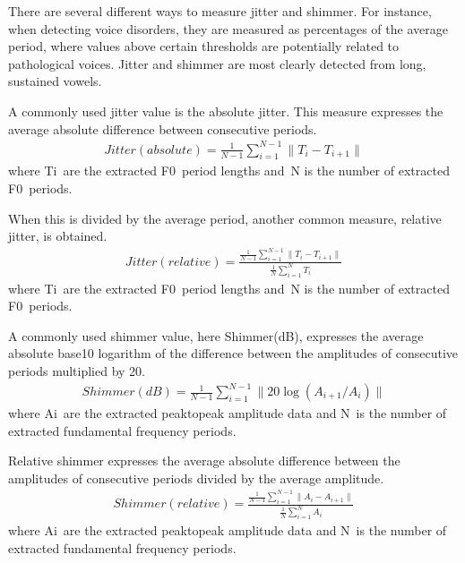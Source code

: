 \documentclass[letterpaper,10pt,english]{jupyterBook}
\begin{document}
\sphinxAtStartPar
There are several different ways to measure jitter and shimmer. For
instance, when detecting voice disorders, they are measured as
percentages of the average period, where values above certain thresholds
are potentially related to pathological voices. Jitter and shimmer are
most clearly detected from long, sustained vowels.

\sphinxAtStartPar
A commonly used jitter value is the absolute jitter. This measure
expresses the average absolute difference between consecutive periods.
\begin{equation*}
\begin{split} Jitter(absolute) = \frac{1}{N-1}\sum_{i=1}^{N-1}\|T_i-T_{i+1}\|
\end{split}
\end{equation*}
\sphinxAtStartPar
where Ti are the extracted F0 period lengths and N is the number of
extracted F0 periods.

\sphinxAtStartPar
When this is divided by the average period, another common measure,
relative jitter, is obtained.
\begin{equation*}
\begin{split} Jitter(relative) =
\frac{\frac{1}{N-1}\sum_{i=1}^{N-1}\|T_i-T_{i+1}\|}{\frac{1}{N}\sum_{i=1}^{N}T_i}
\end{split}
\end{equation*}
\sphinxAtStartPar
where Ti are the extracted F0 period lengths and N is the number of
extracted F0 periods.

\sphinxAtStartPar
A commonly used shimmer value, here Shimmer(dB), expresses the average
absolute base\sphinxhyphen{}10 logarithm of the difference between the amplitudes of
consecutive periods multiplied by 20.
\begin{equation*}
\begin{split} Shimmer(dB) =
\frac{1}{N-1}\sum_{i=1}^{N-1}\|20\log(A_{i+1}/A_i)\| \end{split}
\end{equation*}
\sphinxAtStartPar
where Ai are the extracted peak\sphinxhyphen{}to\sphinxhyphen{}peak amplitude data and N is the
number of extracted fundamental frequency periods.

\sphinxAtStartPar
Relative shimmer expresses the average absolute difference between the
amplitudes of consecutive periods divided by the average amplitude.
\begin{equation*}
\begin{split} Shimmer(relative) =
\frac{\frac{1}{N-1}\sum_{i=1}^{N-1}\|A_i-A_{i+1}\|}{\frac{1}{N}\sum_{i=1}^{N}A_i}
\end{split}
\end{equation*}
\sphinxAtStartPar
where Ai are the extracted peak\sphinxhyphen{}to\sphinxhyphen{}peak amplitude data and N is the
number of extracted fundamental frequency periods.
\end{document}
